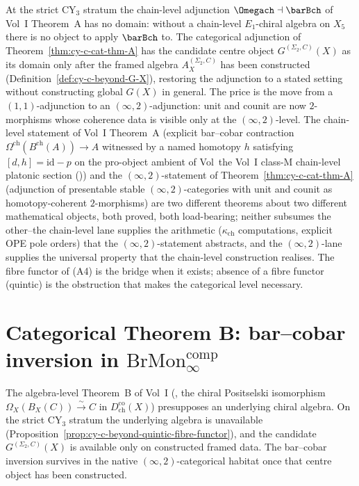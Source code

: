 \begin{remark}
\label{rem:cy-c-cat-thm-A-why-level}
At the strict CY$_3$ stratum the chain-level adjunction $\Omegach \dashv \barBch$
of Vol~I Theorem~A has no domain: without a chain-level $E_1$-chiral
algebra on $X_5$ there is no object to apply $\barBch$ to. The
categorical adjunction of Theorem~\ref{thm:cy-c-cat-thm-A} has
the candidate centre object $G^{(\Sigma_2,C)}(X)$ as its domain only
after the framed algebra $A_X^{(\Sigma_2,C)}$ has been constructed
(Definition~\ref{def:cy-c-beyond-G-X}), restoring the adjunction to
a stated setting without constructing global $G(X)$ in general. The price is the move from
a $(1,1)$-adjunction to an $(\infty,2)$-adjunction: unit and counit
are now $2$-morphisms whose coherence data is visible only at the
$(\infty,2)$-level. The chain-level statement of Vol~I Theorem~A
(explicit bar--cobar contraction $\Omega^{\mathrm{ch}}(B^{\mathrm{ch}}(A)) \to A$
witnessed by a named homotopy $h$ satisfying $[d, h] = \mathrm{id} - p$
on the pro-object ambient of
Vol~the Vol~I class-M chain-level platonic section (\cite{VolI})) and the
$(\infty,2)$-statement of Theorem~\ref{thm:cy-c-cat-thm-A}
(adjunction of presentable stable $(\infty,2)$-categories with unit
and counit as homotopy-coherent $2$-morphisms) are two different
theorems about two different mathematical objects, both proved,
both load-bearing; neither subsumes the other--the chain-level
lane supplies the arithmetic ($\kappa_{\mathrm{ch}}$ computations,
explicit OPE pole orders) that the $(\infty,2)$-statement abstracts,
and the
$(\infty,2)$-lane supplies the universal property that the
chain-level construction realises. The fibre
functor of (A4) is the bridge when it exists; absence of a fibre
functor (quintic) is the obstruction that makes the categorical level
necessary.
\end{remark}

\section{Categorical Theorem B: bar--cobar inversion in \texorpdfstring{$\mathrm{BrMon}^{\mathrm{comp}}_\infty$}{BrMon-comp-inf}}
\label{sec:cy-c-beyond-cat-thm-B}

The algebra-level Theorem~B of Vol~I
(\cite{VolI}, the chiral Positselski
isomorphism $\Omega_X(B_X(C)) \xrightarrow{\sim} C$ in
$D^{\mathrm{co}}_{\mathrm{ch}}(X)$) presupposes an underlying chiral
algebra. On the strict CY$_3$ stratum the underlying algebra is
unavailable (Proposition~\ref{prop:cy-c-beyond-quintic-fibre-functor}),
and the candidate $G^{(\Sigma_2,C)}(X)$ is available only on constructed
framed data. The bar--cobar inversion survives in the native
$(\infty,2)$-categorical habitat once that centre object has been
constructed.


